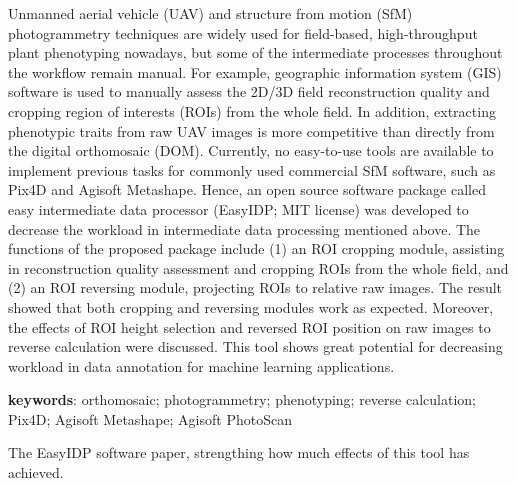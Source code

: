 \begin{center}
{\begin{minipage}{0.95\textwidth}
      Unmanned aerial vehicle (UAV) and structure from motion (SfM) photogrammetry techniques are widely used for field-based, high-throughput plant phenotyping nowadays, but some of the intermediate processes throughout the workflow remain manual. For example, geographic information system (GIS) software is used to manually assess the 2D/3D field reconstruction quality and cropping region of interests (ROIs) from the whole field. In addition, extracting phenotypic traits from raw UAV images is more competitive than directly from the digital orthomosaic (DOM). Currently, no easy-to-use tools are available to implement previous tasks for commonly used commercial SfM software, such as Pix4D and Agisoft Metashape. Hence, an open source software package called easy intermediate data processor (EasyIDP; MIT license) was developed to decrease the workload in intermediate data processing mentioned above. The functions of the proposed package include (1) an ROI cropping module, assisting in reconstruction quality assessment and cropping ROIs from the whole field, and (2) an ROI reversing module, projecting ROIs to relative raw images. The result showed that both cropping and reversing modules work as expected. Moreover, the effects of ROI height selection and reversed ROI position on raw images to reverse calculation were discussed. This tool shows great potential for decreasing workload in data annotation for machine learning applications.

      \vspace{5mm}
      \textbf{keywords}: orthomosaic; photogrammetry; phenotyping; reverse calculation; Pix4D; Agisoft Metashape; Agisoft PhotoScan

    \end{minipage}
  }
\end{center}

The EasyIDP software paper, strengthing how much effects of this tool has achieved.